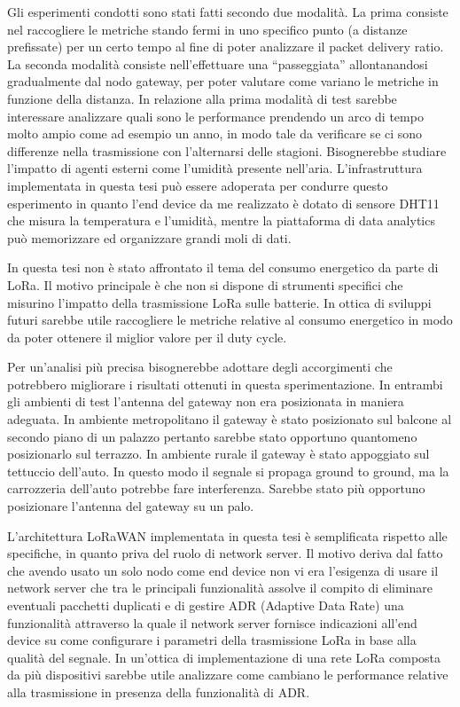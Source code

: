 \documentclass[12pt,a4paper,openright,twoside]{report}
\begin{document}
Gli esperimenti condotti sono stati fatti secondo due modalit\`a. La prima consiste nel raccogliere le metriche stando fermi in uno specifico punto (a distanze prefissate) per un certo tempo al fine di poter analizzare il packet delivery ratio. La seconda modalit\`a consiste nell'effettuare una ``passeggiata'' allontanandosi gradualmente dal nodo gateway, per poter valutare come variano le metriche in funzione della distanza. In relazione alla prima modalit\`a di test sarebbe interessare analizzare quali sono le performance prendendo un arco di tempo molto ampio come ad esempio un anno, in modo tale da verificare se ci sono differenze nella trasmissione con l'alternarsi delle stagioni. Bisognerebbe studiare l'impatto di agenti esterni come l'umidit\`a presente nell'aria. L'infrastruttura implementata in questa tesi pu\`o essere adoperata per condurre questo esperimento in quanto l'end device da me realizzato \`e dotato di sensore DHT11 che misura la temperatura e l'umidit\`a, mentre la piattaforma di data analytics pu\`o memorizzare ed organizzare grandi moli di dati. 

In questa tesi non \`e stato affrontato il tema del consumo energetico da parte di LoRa. Il motivo principale \`e che non si dispone di strumenti specifici che misurino l'impatto della trasmissione LoRa sulle batterie. In ottica di sviluppi futuri sarebbe utile raccogliere le metriche relative al consumo energetico in modo da poter ottenere il miglior valore per il duty cycle.   

Per un'analisi pi\`u precisa bisognerebbe adottare degli accorgimenti che potrebbero migliorare i risultati ottenuti in questa sperimentazione. In entrambi gli ambienti di test l'antenna del gateway non era posizionata in maniera adeguata. In ambiente metropolitano il gateway \`e stato posizionato sul balcone al secondo piano di un palazzo pertanto sarebbe stato opportuno quantomeno posizionarlo sul terrazzo. In ambiente rurale il gateway \`e stato appoggiato sul tettuccio dell'auto. In questo modo il segnale si propaga ground to ground, ma la carrozzeria dell'auto potrebbe fare interferenza. Sarebbe stato pi\`u opportuno posizionare l'antenna del gateway su un palo. 

L'architettura LoRaWAN implementata in questa tesi \`e semplificata rispetto alle specifiche, in quanto priva del ruolo di network server. Il motivo deriva dal fatto che avendo usato un solo nodo come end device non vi era l'esigenza di usare il network server che tra le principali funzionalit\`a assolve il compito di eliminare eventuali pacchetti duplicati e di gestire ADR (Adaptive Data Rate) una funzionalit\`a attraverso la quale il network server fornisce indicazioni all'end device su come configurare i parametri della trasmissione LoRa in base alla qualit\`a del segnale. In un'ottica di implementazione di una rete LoRa composta da pi\`u dispositivi sarebbe utile analizzare come cambiano le performance relative alla trasmissione in presenza della funzionalit\`a di ADR.         
\end{document}
